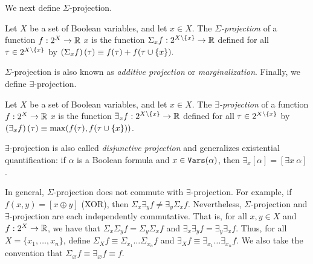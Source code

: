 We next define $\Sigma$-projection.
\begin{definition}
\label{def_sum}
    Let $X$ be a set of Boolean variables, and let $x \in X$.
    The \emph{$\Sigma$-projection} of a function $f: 2^X \to \mathbb{R}$ \wrt{} $x$ is the function $\Sigma_x f: 2^{X \setminus \left\{ x \right\}} \to \mathbb{R}$ defined for all $\tau \in 2^{X \setminus \left\{ x \right\}}$ by
    $\left( \Sigma_x f \right)(\tau) \equiv f(\tau) + f(\tau \cup \left\{ x \right\}).$
\end{definition}
$\Sigma$-projection is also known as \emph{additive projection} or 
\emph{marginalization}.
Finally, we define $\exists$-projection.
\begin{definition}
\label{def_exist}
    Let $X$ be a set of Boolean variables, and let $x \in X$.
    The \emph{$\exists$-projection} of a function $f: 2^X \to \mathbb{R}$ \wrt{} $x$ is the function $\exists_x f: 2^{X \setminus \left\{ x \right\}} \to \mathbb{R}$ defined for all $\tau \in 2^{X \setminus \left\{ x \right\}}$ by $\left( \exists_x f \right)(\tau) \equiv \max(f(\tau), f(\tau \cup \left\{ x \right\}))$.
\end{definition}
$\exists$-projection is also called \emph{disjunctive projection} and generalizes existential quantification: if $\alpha$ is a Boolean formula and $x \in \texttt{\upshape Vars}(\alpha)$, then $\exists_x [\alpha] = [\exists x ~ \alpha]$.



In general, $\Sigma$-projection does not commute with $\exists$-projection. For example, if $f(x, y) = [x \oplus y]$ (XOR), then $\Sigma_x \exists_y f \neq \exists_y \Sigma_x f$.
Nevertheless, $\Sigma$-projection and $\exists$-projection are each independently commutative. 
That is, for all $x, y \in X$ and $f: 2^X \to \mathbb{R}$, we have that $\Sigma_x \Sigma_y f = \Sigma_y \Sigma_x f$ and $\exists_x \exists_y f = \exists_y \exists_x f$. 
Thus, for all $X = \{x_1, \ldots, x_n\}$, define $\Sigma_X f \equiv \Sigma_{x_1} \ldots \Sigma_{x_n} f$ and $\exists_X f \equiv \exists_{x_1} \ldots \exists_{x_n} f$. 
We also take the convention that $\Sigma_\varnothing f \equiv \exists_\varnothing f \equiv f$. 